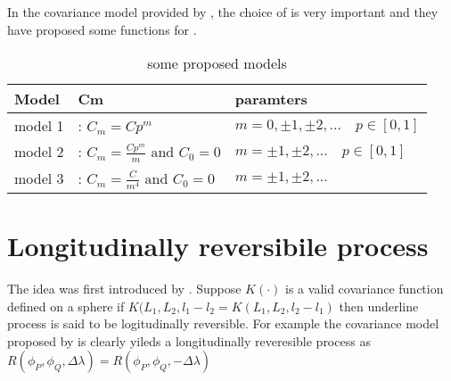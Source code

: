 		
		In the covariance model provided by \cite{Huang2012}, the choice of \Cm is very important and they have proposed some functions for \Cm.
		
		
		\begin{table}
			\centering
			\begin{tabular}{l|l|l}
				\hline
				Model   & Cm                                            & paramters                                \\ 
				\hline \hline
				model 1 & : $C_m = Cp^m$                                & $m=0, \pm 1, \pm 2,... \quad p\in [0,1]$ \\
				model 2 & : $C_m = \frac{Cp^m}{m} \mbox{ and } C_0 = 0$ & $m=\pm 1, \pm 2,... \quad p\in [0,1]$    \\
				model 3 & : $C_m = \frac{C}{m^4} \mbox{ and } C_0 = 0$  & $m=\pm 1, \pm 2,...$                     \\
				\hline
			\end{tabular}
			\caption{some proposed \Cm models}
		\end{table}
			
		\section{Longitudinally reversibile process}
			
		The idea was first introduced by \cite{Stein2007}. Suppose $K(\cdot)$ is a valid covariance function defined on a sphere if $K(L_1, L_2, l_1-l_2 = K(L_1, L_2, l_2-l_1)$ then underline process is said to be logitudinally reversible. For example the covariance model proposed by \cite{Huang2012} is clearly yileds a longitudinally reveresible process as $R(\phi_P, \phi_Q, \Delta\lambda) = R(\phi_P, \phi_Q, -\Delta\lambda)$    
			
			
			
			
